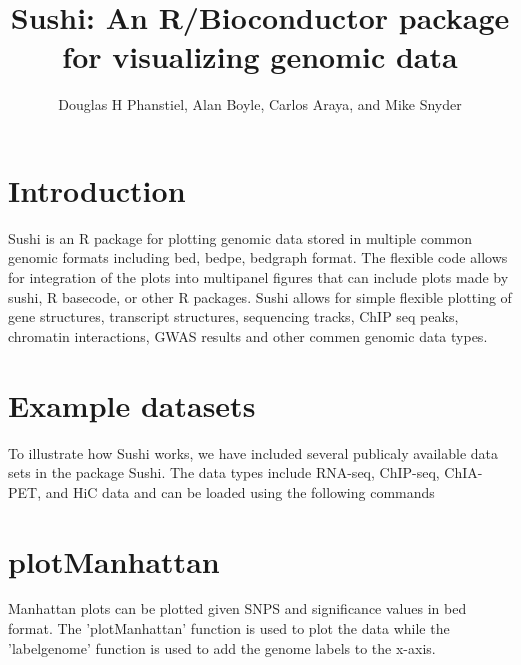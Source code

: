 \documentclass{article}
\title{Sushi: An R/Bioconductor package for visualizing genomic data}
\author{Douglas H Phanstiel, Alan Boyle, Carlos Araya, and Mike Snyder}
\begin{document}

\maketitle
\section{Introduction}

Sushi is an R package for plotting genomic data stored in multiple common genomic formats including bed, bedpe, bedgraph format. The flexible code allows for integration of the plots into multipanel figures that can include plots made by sushi, R basecode, or other R packages.  Sushi allows for simple flexible plotting of gene structures, transcript structures, sequencing tracks, ChIP seq peaks, chromatin interactions, GWAS results and other commen genomic data types.   


\section{Example datasets}
To illustrate how Sushi works, we have included several publicaly available data sets in the package Sushi. The data types include RNA-seq, ChIP-seq, ChIA-PET, and HiC data and can be loaded using the following commands

\begin{Schunk}
\end{Schunk}

\section{plotManhattan}

Manhattan plots can be plotted given SNPS and significance values in bed format.  The 'plotManhattan' function is used to plot the data while the 'labelgenome' function is used to add the genome labels to the x-axis.
\end{document}
